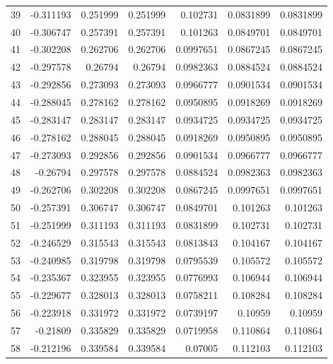 \begin{tabular}{rrrrrrr}
  39 & -0.311193    & 0.251999    & 0.251999    &  0.102731    & 0.0831899   & 0.0831899   \\
  40 & -0.306747    & 0.257391    & 0.257391    &  0.101263    & 0.0849701   & 0.0849701   \\
  41 & -0.302208    & 0.262706    & 0.262706    &  0.0997651   & 0.0867245   & 0.0867245   \\
  42 & -0.297578    & 0.26794     & 0.26794     &  0.0982363   & 0.0884524   & 0.0884524   \\
  43 & -0.292856    & 0.273093    & 0.273093    &  0.0966777   & 0.0901534   & 0.0901534   \\
  44 & -0.288045    & 0.278162    & 0.278162    &  0.0950895   & 0.0918269   & 0.0918269   \\
  45 & -0.283147    & 0.283147    & 0.283147    &  0.0934725   & 0.0934725   & 0.0934725   \\
  46 & -0.278162    & 0.288045    & 0.288045    &  0.0918269   & 0.0950895   & 0.0950895   \\
  47 & -0.273093    & 0.292856    & 0.292856    &  0.0901534   & 0.0966777   & 0.0966777   \\
  48 & -0.26794     & 0.297578    & 0.297578    &  0.0884524   & 0.0982363   & 0.0982363   \\
  49 & -0.262706    & 0.302208    & 0.302208    &  0.0867245   & 0.0997651   & 0.0997651   \\
  50 & -0.257391    & 0.306747    & 0.306747    &  0.0849701   & 0.101263    & 0.101263    \\
  51 & -0.251999    & 0.311193    & 0.311193    &  0.0831899   & 0.102731    & 0.102731    \\
  52 & -0.246529    & 0.315543    & 0.315543    &  0.0813843   & 0.104167    & 0.104167    \\
  53 & -0.240985    & 0.319798    & 0.319798    &  0.0795539   & 0.105572    & 0.105572    \\
  54 & -0.235367    & 0.323955    & 0.323955    &  0.0776993   & 0.106944    & 0.106944    \\
  55 & -0.229677    & 0.328013    & 0.328013    &  0.0758211   & 0.108284    & 0.108284    \\
  56 & -0.223918    & 0.331972    & 0.331972    &  0.0739197   & 0.10959     & 0.10959     \\
  57 & -0.21809     & 0.335829    & 0.335829    &  0.0719958   & 0.110864    & 0.110864    \\
  58 & -0.212196    & 0.339584    & 0.339584    &  0.07005     & 0.112103    & 0.112103    \\

\end{tabular}
